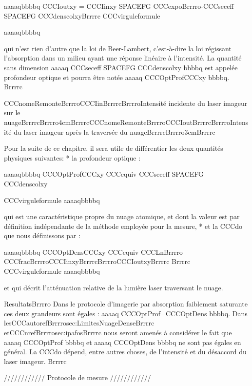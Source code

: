 aaaaqbbbbq
CCCIoutxy = CCCIinxy  SPACEFG  CCCexpoBrrrro-CCCseceff SPACEFG CCCdenscolxyBrrrrc
CCCvirguleformule	
	
aaaaqbbbbq



qui n'est rien d'autre que la loi de Beer-Lambert, c'est-à-dire la loi régissant l'absorption dans un milieu ayant une réponse linéaire à l'intensité. La quantité sans dimension aaaaq CCCseceff SPACEFG CCCdenscolxy bbbbq est appelée profondeur optique et pourra être notée aaaaq CCCOptProfCCCxy bbbbq.
Brrrrc



CCCnomeRemonteBrrrroCCCIinBrrrrcBrrrroIntensité incidente du laser imageur sur le nuageBrrrrcBrrrro4cmBrrrrcCCCnomeRemonteBrrrroCCCIoutBrrrrcBrrrroIntensité du laser imageur après la traversée du nuageBrrrrcBrrrro3cmBrrrrc

Pour la suite de ce chapitre, il sera utile de différentier les deux quantités physiques suivantes:
	* la profondeur optique :



aaaaqbbbbq
	CCCOptProfCCCxy CCCequiv CCCseceff SPACEFG CCCdenscolxy
	
	CCCvirguleformule
aaaaqbbbbq



	qui est une caractéristique propre du nuage atomique, et dont la valeur est par définition indépendante de la méthode employée pour la mesure,
	* et la CCCdo que nous définissons par :



aaaaqbbbbq
	CCCOptDensCCCxy 
	CCCequiv CCCLnBrrrro	CCCfracBrrrroCCCIinxyBrrrrcBrrrroCCCIoutxyBrrrrc	Brrrrc
	CCCvirguleformule
aaaaqbbbbq



et qui décrit l'atténuation relative de la lumière laser traversant le nuage. 





ResultatsBrrrro
Dans le protocole d'imagerie par absorption faiblement saturante ces deux grandeurs sont égales : aaaaq CCCOptProf=CCCOptDens bbbbq. Dans lesCCCautorefBrrrrosec:LimitesNuageDenseBrrrrc etCCCnrefBrrrrosec:ipafosBrrrrc nous seront amenés à considérer le fait que aaaaq CCCOptProf bbbbq et aaaaq CCCOptDens bbbbq ne sont pas égales en général. La CCCdo dépend, entre autres choses, de l'intensité et du désaccord du laser imageur.
Brrrrc



//////////// Protocole de mesure ////////////

